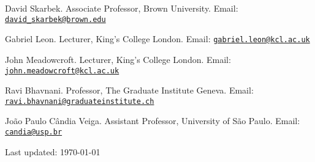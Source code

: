 \documentclass[a4paper]{article}
\renewenvironment{itemize}{
  \begin{list}{}{
    \setlength{\leftmargin}{1.5em}
  }
}{
  \end{list}
}
\begin{document}
\begin{itemize}
	\item David Skarbek. Associate Professor, Brown University. Email: \href{mailto:davidskarbek@gmail.com}{\texttt{david\_skarbek@brown.edu}}
	\item Gabriel Leon. Lecturer, King's College London. Email: \href{mailto:gabriel.leon@kcl.ac.uk}{\texttt{gabriel.leon@kcl.ac.uk}}
	\item John Meadowcroft. Lecturer, King's College London. Email: \href{mailto:john.meadowcroft@kcl.ac.uk}{\texttt{john.meadowcroft@kcl.ac.uk}}
	\item Ravi Bhavnani. Professor, The Graduate Institute Geneva. Email: \href{mailto:ravi.bhavnani@graduateinstitute.ch}{\texttt{ravi.bhavnani@graduateinstitute.ch}}
	\item Jo\~{a}o Paulo C\^{a}ndia Veiga. Assistant Professor, University of S\~{a}o Paulo. Email: \href{mailto:candia@usp.br}{\texttt{candia@usp.br}}
\end{itemize}

\bigskip

\begin{center}
	\begin{footnotesize}
		Last updated: \today
	\end{footnotesize}
\end{center}
\end{document}
